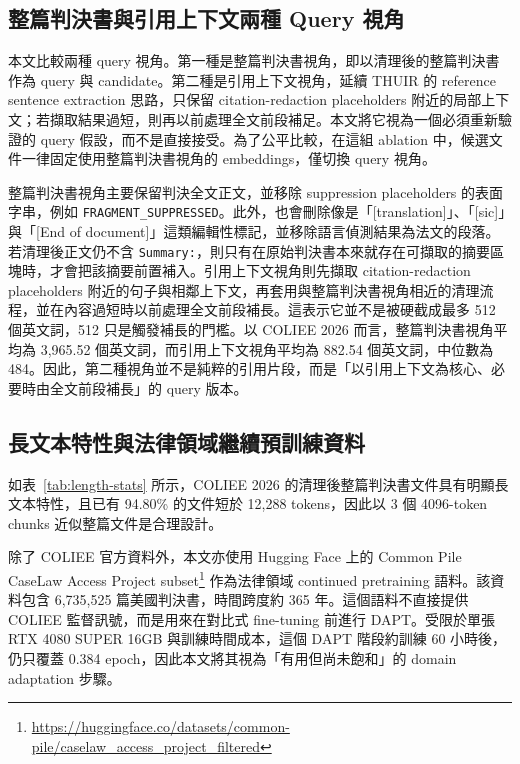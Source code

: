 \subsection{整篇判決書與引用上下文兩種 Query 視角}

本文比較兩種 query 視角。第一種是整篇判決書視角，即以清理後的整篇判決書作為 query 與 candidate。第二種是引用上下文視角，延續 THUIR 的 reference sentence extraction 思路，只保留 citation-redaction placeholders 附近的局部上下文；若擷取結果過短，則再以前處理全文前段補足。本文將它視為一個必須重新驗證的 query 假設，而不是直接接受。為了公平比較，在這組 ablation 中，候選文件一律固定使用整篇判決書視角的 embeddings，僅切換 query 視角。

整篇判決書視角主要保留判決全文正文，並移除 suppression placeholders 的表面字串，例如 \texttt{FRAGMENT\allowbreak\_SUPPRESSED}。此外，也會刪除像是「[translation]」、「[sic]」與「[End of document]」這類編輯性標記，並移除語言偵測結果為法文的段落。若清理後正文仍不含 \texttt{Summary:}，則只有在原始判決書本來就存在可擷取的摘要區塊時，才會把該摘要前置補入。引用上下文視角則先擷取 citation-redaction placeholders 附近的句子與相鄰上下文，再套用與整篇判決書視角相近的清理流程，並在內容過短時以前處理全文前段補長。這表示它並不是被硬截成最多 512 個英文詞，512 只是觸發補長的門檻。以 COLIEE 2026 而言，整篇判決書視角平均為 3,965.52 個英文詞，而引用上下文視角平均為 882.54 個英文詞，中位數為 484。因此，第二種視角並不是純粹的引用片段，而是「以引用上下文為核心、必要時由全文前段補長」的 query 版本。

\subsection{長文本特性與法律領域繼續預訓練資料}

如表~\ref{tab:length-stats} 所示，COLIEE 2026 的清理後整篇判決書文件具有明顯長文本特性，且已有 94.80\% 的文件短於 12,288 tokens，因此以 3 個 4096-token chunks 近似整篇文件是合理設計。

除了 COLIEE 官方資料外，本文亦使用 Hugging Face 上的 Common Pile CaseLaw Access Project subset\footnote{\url{https://huggingface.co/datasets/common-pile/caselaw_access_project_filtered}} 作為法律領域 continued pretraining 語料。該資料包含 6,735,525 篇美國判決書，時間跨度約 365 年。這個語料不直接提供 COLIEE 監督訊號，而是用來在對比式 fine-tuning 前進行 DAPT。受限於單張 RTX 4080 SUPER 16GB 與訓練時間成本，這個 DAPT 階段約訓練 60 小時後，仍只覆蓋 0.384 epoch，因此本文將其視為「有用但尚未飽和」的 domain adaptation 步驟。
